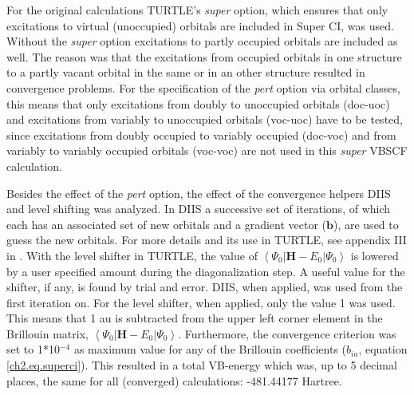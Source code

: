 For the original calculations TURTLE's \textit{super} option, which ensures that only excitations to virtual (unoccupied) orbitals are included in Super CI, was used. Without the \textit{super} option excitations to partly occupied orbitals are included as well. The reason was that the excitations from occupied orbitals in one structure to a partly vacant orbital in the same or in an other structure resulted in convergence problems. For the specification of the \textit{pert} option via orbital classes, this means that only excitations from doubly to unoccupied orbitals \mbox{(doc-uoc)} and excitations from variably to unoccupied orbitals \mbox{(voc-uoc)} have to be tested, since excitations from doubly occupied to variably occupied \mbox{(doc-voc)} and from variably to variably occupied orbitals \mbox{(voc-voc)} are not used in this \textit{super} VBSCF calculation.

Besides the effect of the \textit{pert} option, the effect of the convergence helpers DIIS \cite{diis1,diis2} and level shifting \cite{level1,level2} was analyzed. In DIIS a successive set of iterations, of which each has an associated set of new orbitals and a gradient vector ($\mathbf{b}$), are used to guess the new orbitals. For more details and its use in TURTLE, see appendix III in \cite{koos1}. With the level shifter in TURTLE, the value of $\left < \Psi_0 | \mathbf{H} - E_0 | \Psi_0 \right >$ is lowered by a user specified amount during the diagonalization step. A useful value for the shifter, if any, is found by trial and error. DIIS, when applied, was used from the first iteration on. For the level shifter, when applied, only the value 1 was used. This means that 1 au is subtracted from the upper left corner element in the Brillouin matrix, $\left< \Psi_0 | \mathbf{H} - E_0 | \Psi_0 \right>$. Furthermore, the convergence criterion was set to 1*10$^{-4}$ as maximum value for any of the Brillouin coefficients ($b_{ia}$, equation \ref{ch2.eq.superci}). This resulted in a total VB-energy which was, up to 5 decimal places, the same for all (converged) calculations: -481.44177 Hartree.

